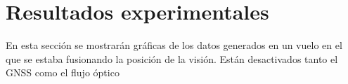 

\section{Resultados experimentales}
En esta sección se mostrarán gráficas de los datos generados en un vuelo en el que se estaba fusionando la posición de la visión. Están desactivados tanto el GNSS como el flujo óptico



\figExpA
\figExpB

\endinput
